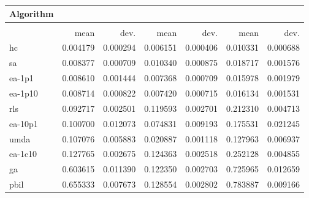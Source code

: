 \begin{tabular}{@{} l *{6}{>{{}}N{1}{2}} @{}}
\toprule
{Algorithm} &  \\
\midrule
&  &  &  \\
\midrule
& {mean} & {dev.} & {mean} & {dev.} & {mean} & {dev.} \\
\midrule
hc & 0.004179 & 0.000294 & 0.006151 & 0.000406 & 0.010331 & 0.000688 \\
sa & 0.008377 & 0.000709 & 0.010340 & 0.000875 & 0.018717 & 0.001576 \\
ea-1p1 & 0.008610 & 0.001444 & 0.007368 & 0.000709 & 0.015978 & 0.001979 \\
ea-1p10 & 0.008714 & 0.000822 & 0.007420 & 0.000715 & 0.016134 & 0.001531 \\
rls & 0.092717 & 0.002501 & 0.119593 & 0.002701 & 0.212310 & 0.004713 \\
ea-10p1 & 0.100700 & 0.012073 & 0.074831 & 0.009193 & 0.175531 & 0.021245 \\
umda & 0.107076 & 0.005883 & 0.020887 & 0.001118 & 0.127963 & 0.006937 \\
ea-1c10 & 0.127765 & 0.002675 & 0.124363 & 0.002518 & 0.252128 & 0.004855 \\
ga & 0.603615 & 0.011390 & 0.122350 & 0.002703 & 0.725965 & 0.012659 \\
pbil & 0.655333 & 0.007673 & 0.128554 & 0.002802 & 0.783887 & 0.009166 \\
\bottomrule
\end{tabular}
